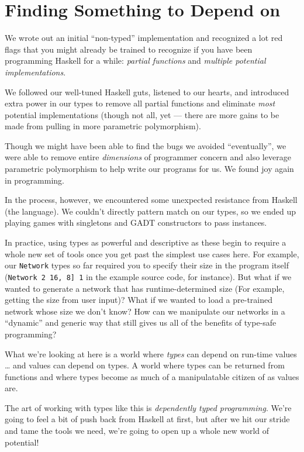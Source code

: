 \documentclass[]{article}
\begin{document}
\section{Finding Something to Depend on}\label{finding-something-to-depend-on}

We wrote out an initial ``non-typed'' implementation and recognized a lot red
flags that you might already be trained to recognize if you have been
programming Haskell for a while: \emph{partial functions} and \emph{multiple
potential implementations}.

We followed our well-tuned Haskell guts, listened to our hearts, and introduced
extra power in our types to remove all partial functions and eliminate
\emph{most} potential implementations (though not all, yet --- there are more
gains to be made from pulling in more parametric polymorphism).

Though we might have been able to find the bugs we avoided ``eventually'', we
were able to remove entire \emph{dimensions} of programmer concern and also
leverage parametric polymorphism to help write our programs for us. We found joy
again in programming.

In the process, however, we encountered some unexpected resistance from Haskell
(the language). We couldn't directly pattern match on our types, so we ended up
playing games with singletons and GADT constructors to pass instances.

In practice, using types as powerful and descriptive as these begin to require a
whole new set of tools once you get past the simplest use cases here. For
example, our \texttt{Network} types so far required you to specify their size in
the program itself (\texttt{Network\ 2\ \textquotesingle{}{[}16,\ 8{]}\ 1} in
the example source code, for instance). But what if we wanted to generate a
network that has runtime-determined size (For example, getting the size from
user input)? What if we wanted to load a pre-trained network whose size we don't
know? How can we manipulate our networks in a ``dynamic'' and generic way that
still gives us all of the benefits of type-safe programming?

What we're looking at here is a world where \emph{types} can depend on run-time
values \ldots{} and values can depend on types. A world where types can be
returned from functions and where types become as much of a manipulatable
citizen of as values are.

The art of working with types like this is \emph{dependently typed programming}.
We're going to feel a bit of push back from Haskell at first, but after we hit
our stride and tame the tools we need, we're going to open up a whole new world
of potential!
\end{document}
